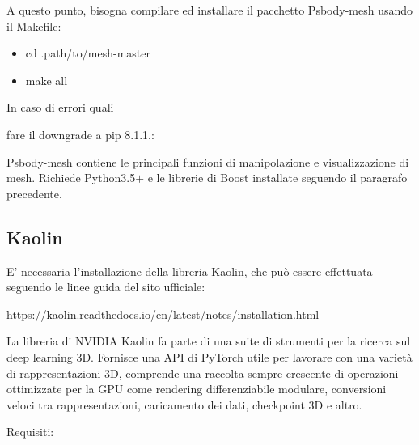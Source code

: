 A questo punto, bisogna compilare ed installare il pacchetto Psbody-mesh usando il Makefile:

\medskip

\begin{itemize}
\item cd .path/to/mesh-master
\item make all
\end{itemize}

\medskip

In caso di errori quali


\medskip


\medskip 

fare il downgrade a pip 8.1.1.:

\medskip





\medskip

Psbody-mesh contiene le principali funzioni di manipolazione e visualizzazione di mesh. Richiede Python3.5$+$ e le librerie di Boost installate seguendo il paragrafo precedente.

\newpage

\subsection{Kaolin}

\medskip

E’ necessaria l’installazione della libreria Kaolin, che può essere effettuata seguendo le linee guida del sito ufficiale: 

\medskip

\url{https://kaolin.readthedocs.io/en/latest/notes/installation.html}

\medskip

La libreria di NVIDIA Kaolin fa parte di una suite di strumenti per la ricerca sul deep learning 3D. Fornisce una API di PyTorch utile per lavorare con una varietà di rappresentazioni 3D, comprende una raccolta sempre crescente di operazioni ottimizzate per la GPU come rendering differenziabile modulare, conversioni veloci tra rappresentazioni, caricamento dei dati, checkpoint 3D e altro.

\medskip

Requisiti:

